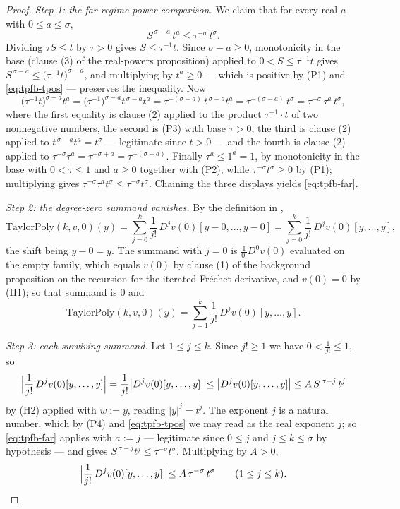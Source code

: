 \begin{proof}
\medskip\noindent\emph{Step 1: the far-regime power comparison.}
We claim that for every real $a$ with $0\le a\le\sigma$,
\begin{equation}\label{eq:tpfb-far}
  S^{\,\sigma-a}\,t^{a}\le\tau^{-\sigma}\,t^{\sigma}.
\end{equation}
Dividing $\tau S\le t$ by $\tau>0$ gives $S\le\tau^{-1}t$.  Since $\sigma-a\ge0$, monotonicity
in the base (clause (3) of the real-powers proposition) applied to $0<S\le\tau^{-1}t$ gives
$S^{\,\sigma-a}\le\bigl(\tau^{-1}t\bigr)^{\sigma-a}$, and multiplying by $t^{a}\ge0$ --- which
is positive by (P1) and \eqref{eq:tpfb-tpos} --- preserves the inequality.  Now
\[
  \bigl(\tau^{-1}t\bigr)^{\sigma-a}t^{a}
  =\bigl(\tau^{-1}\bigr)^{\sigma-a}t^{\,\sigma-a}t^{a}
  =\tau^{-(\sigma-a)}\,t^{\,\sigma-a}t^{a}
  =\tau^{-(\sigma-a)}\,t^{\sigma}
  =\tau^{-\sigma}\,\tau^{a}\,t^{\sigma},
\]
where the first equality is clause (2) applied to the product $\tau^{-1}\cdot t$ of two
nonnegative numbers, the second is (P3) with base $\tau>0$, the third is clause (2) applied to
$t^{\,\sigma-a}t^{a}=t^{\sigma}$ --- legitimate since $t>0$ --- and the fourth is clause (2)
applied to $\tau^{-\sigma}\tau^{a}=\tau^{-\sigma+a}=\tau^{-(\sigma-a)}$.  Finally
$\tau^{a}\le1^{a}=1$, by monotonicity in the base with $0<\tau\le1$ and $a\ge0$ together with
(P2), while $\tau^{-\sigma}t^{\sigma}\ge0$ by (P1); multiplying gives
$\tau^{-\sigma}\tau^{a}t^{\sigma}\le\tau^{-\sigma}t^{\sigma}$.  Chaining the three displays
yields \eqref{eq:tpfb-far}.

\medskip\noindent\emph{Step 2: the degree-zero summand vanishes.}
By the definition in ,
\[
  \mathrm{TaylorPoly}(k,v,0)(y)
  =\sum_{j=0}^{k}\frac{1}{j!}\,D^{j}v(0)[y-0,\ldots,y-0]
  =\sum_{j=0}^{k}\frac{1}{j!}\,D^{j}v(0)[y,\ldots,y],
\]
the shift being $y-0=y$.  The summand with $j=0$ is $\frac{1}{0!}D^{0}v(0)$ evaluated on the
empty family, which equals $v(0)$ by clause (1) of the background proposition on the recursion
for the iterated Fr\'echet derivative, and $v(0)=0$ by (H1); so that summand is $0$ and
\begin{equation}\label{eq:tpfb-sum}
  \mathrm{TaylorPoly}(k,v,0)(y)=\sum_{j=1}^{k}\frac{1}{j!}\,D^{j}v(0)[y,\ldots,y].
\end{equation}

\medskip\noindent\emph{Step 3: each surviving summand.}
Let $1\le j\le k$.  Since $j!\ge1$ we have $0<\frac{1}{j!}\le1$, so
\[
  \Bigl\lvert\frac{1}{j!}\,D^{j}v(0)[y,\ldots,y]\Bigr\rvert
  =\frac{1}{j!}\bigl\lvert D^{j}v(0)[y,\ldots,y]\bigr\rvert
  \le\bigl\lvert D^{j}v(0)[y,\ldots,y]\bigr\rvert
  \le A\,S^{\,\sigma-j}\,t^{j}
\]
by (H2) applied with $w:=y$, reading $\lvert y\rvert^{j}=t^{j}$.  The exponent $j$ is a natural
number, which by (P4) and \eqref{eq:tpfb-tpos} we may read as the real exponent $j$; so
\eqref{eq:tpfb-far} applies with $a:=j$ --- legitimate since $0\le j$ and $j\le k\le\sigma$ by
hypothesis --- and gives $S^{\,\sigma-j}t^{j}\le\tau^{-\sigma}t^{\sigma}$.  Multiplying by
$A>0$,
\begin{equation}\label{eq:tpfb-term}
  \Bigl\lvert\frac{1}{j!}\,D^{j}v(0)[y,\ldots,y]\Bigr\rvert
  \le A\,\tau^{-\sigma}\,t^{\sigma}\qquad(1\le j\le k).
\end{equation}


\end{proof}

